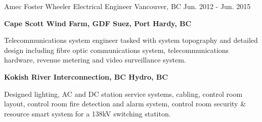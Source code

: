 \begin{cventries}
    \cventry
    {Amec Foster Wheeler} %
    {Electrical Engineer} %
    {Vancouver, BC} %
    {Jun. 2012 - Jun. 2015} %
    { %
        \begin{cvitems}
            \item[]\textbf{Cape Scott Wind Farm, GDF Suez, Port Hardy, BC}
            \item {Telecommunications system engineer tasked with system topography and detailed design including fibre optic communications system, telecommunications hardware, revenue metering and video surveillance system.}
            \item[]\textbf{Kokish River Interconnection, BC Hydro, BC}
            \item{Designed lighting, AC and DC station service systems, cabling, control room layout, control room fire detection and alarm system, control room security \& resource smart system for a 138kV switching statiton.}
        \end{cvitems}
    }
\end{cventries}